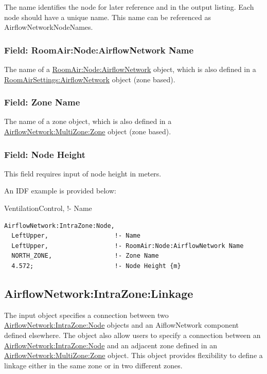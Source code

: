 The name identifies the node for later reference and in the output listing. Each node should have a unique name. This name can be referenced as AirflowNetworkNodeNames.

\subsubsection{Field: RoomAir:Node:AirflowNetwork Name}\label{field-roomairnodeairflownetwork-name}

The name of a \hyperref[roomairnodeairflownetwork]{RoomAir:Node:AirflowNetwork} object, which is also defined in a \hyperref[roomairsettingsairflownetwork]{RoomAirSettings:AirflowNetwork} object (zone based).

\subsubsection{Field: Zone Name}\label{field-zone-name-1-000}

The name of a zone object, which is also defined in a \hyperref[airflownetworkmultizonezone]{AirflowNetwork:MultiZone:Zone} object (zone based).

\subsubsection{Field: Node Height}\label{field-node-height}

This field requires input of node height in meters.

An IDF example is provided below:

VentilationControl, !- Name

\begin{lstlisting}
AirflowNetwork:IntraZone:Node,
  LeftUpper,                  !- Name
  LeftUpper,                  !- RoomAir:Node:AirflowNetwork Name
  NORTH_ZONE,                 !- Zone Name
  4.572;                      !- Node Height {m}
\end{lstlisting}

\subsection{AirflowNetwork:IntraZone:Linkage}\label{airflownetworkintrazonelinkage}

The input object specifies a connection between two \hyperref[airflownetworkintrazonenode]{AirflowNetwork:IntraZone:Node} objects and an AiflowNetwork component defined elsewhere. The object also allow users to specify a connection between an \hyperref[airflownetworkintrazonenode]{AirflowNetwork:IntraZone:Node} and an adjacent zone defined in an \hyperref[airflownetworkmultizonezone]{AirflowNetwork:MultiZone:Zone} object. This object provides flexibility to define a linkage either in the same zone or in two different zones.

